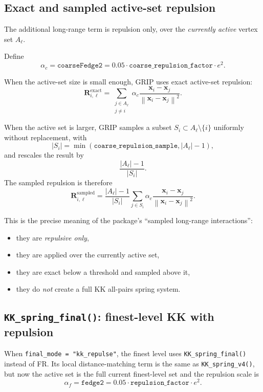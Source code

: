 \documentclass[11pt]{article}
\newcommand{\vect}[1]{\boldsymbol{#1}}
\newcommand{\norm}[1]{\left\lVert #1 \right\rVert}
\begin{document}
\subsection{Exact and sampled active-set repulsion}

The additional long-range term is repulsion only, over the \emph{currently
active} vertex set $A_{\ell}$.

Define
\[
\alpha_c = \texttt{coarseFedge2}
= 0.05 \cdot \texttt{coarse\_repulsion\_factor} \cdot e^2.
\]

When the active-set size is small enough, GRIP uses exact active-set repulsion:
\[
\vect{R}_{i,\ell}^{\text{exact}}
=
\sum_{\substack{j \in A_{\ell}\\j \ne i}}
\alpha_c
\frac{\vect{x}_i - \vect{x}_j}{\norm{\vect{x}_i - \vect{x}_j}^2}.
\]

When the active set is larger, GRIP samples a subset $S_i \subset A_{\ell}\setminus\{i\}$
uniformly without replacement, with
\[
|S_i| = \min(\texttt{coarse\_repulsion\_sample}, |A_{\ell}| - 1),
\]
and rescales the result by
\[
\frac{|A_{\ell}| - 1}{|S_i|}.
\]
The sampled repulsion is therefore
\[
\vect{R}_{i,\ell}^{\text{sampled}}
=
\frac{|A_{\ell}| - 1}{|S_i|}
\sum_{j \in S_i}
\alpha_c
\frac{\vect{x}_i - \vect{x}_j}{\norm{\vect{x}_i - \vect{x}_j}^2}.
\]

This is the precise meaning of the package's ``sampled long-range interactions'':
\begin{itemize}[leftmargin=1.5em]
\item they are \emph{repulsive only},
\item they are applied over the currently active set,
\item they are exact below a threshold and sampled above it,
\item they do \emph{not} create a full KK all-pairs spring system.
\end{itemize}

\subsection{\texttt{KK\_spring\_final()}: finest-level KK with repulsion}

When \texttt{final\_mode = "kk\_repulse"}, the finest level uses
\texttt{KK\_spring\_final()} instead of FR. Its local distance-matching term is
the same as \texttt{KK\_spring\_v4()}, but now the active set is the full current
finest-level set and the repulsion scale is
\[
\alpha_f = \texttt{fedge2}
= 0.05 \cdot \texttt{repulsion\_factor} \cdot e^2.
\]
\end{document}

